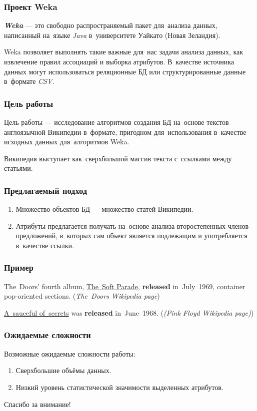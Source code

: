 \documentclass{beamer}
\newcommand{\MARK}[1]{{\bf {\it #1}}}
\begin{document}
\begin{frame}
\frametitle{Проект Weka}
\MARK{Weka} --- это свободно распространяемый пакет для~анализа данных, 
написанный на~языке {\it Java} в~университете Уайкато (Новая Зеландия).

\vspace{1cm}

Weka позволяет выполнять такие важные для~нас задачи анализа данных, 
как извлечение правил ассоциаций и выборка атрибутов.
В~качестве источника данных могут использоваться реляционные БД или структурированные данные в~формате {\it CSV}.
\end{frame}

\begin{frame}
\frametitle{Цель работы}
Цель работы --- исследование алгоритмов создания БД на~основе текстов англоязычной Википедии в~формате,
пригодном для~использования в~качестве исходных данных для~алгоритмов Weka.

\vspace{5mm}

Википедия выступает как~сверхбольшой массив текста с~ссылками между статьями.
\end{frame}

\begin{frame}
\frametitle{Предлагаемый подход}
\begin{enumerate}
\item{
Множество объектов БД --- множество статей Википедии.
}

\item {
Атрибуты предлагается получать на~основе анализа второстепенных членов предложений, 
в~которых сам объект является подлежащим и употребляется в~качестве ссылки.
}
\end{enumerate}
\end{frame}

\begin{frame}
\frametitle{Пример}
The~Doors' fourth album, \underline{The~Soft Parade}, 
{\bf released} in~July~1969, 
container pop-oriented sections. 
({\it The~Doors Wikipedia page})

\vspace{1cm}

\underline{A~sauceful of~secrets} was {\bf released} in~June~1968. 
({\it(Pink Floyd Wikipedia page)})
\end{frame}

\begin{frame}
\frametitle{Ожидаемые сложности}

Возможные ожидаемые сложности работы:

\begin{enumerate}

\item{
Сверхбольшие объёмы данных.
}

\item{
Низкий уровень статистической значимости выделенных атрибутов.
}

\end{enumerate}
\end{frame}

\begin{frame}
{\Large Спасибо за внимание!}
\end{frame}
\end{document}
